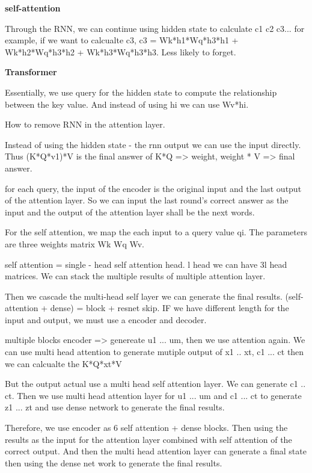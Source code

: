 \documentclass[8pt,UTF8]{article}
\begin{document}
            \textbf{self-attention}
            
            Through the RNN, we can continue using hidden state to calculate c1 c2 c3... for example, if we want to calcualte c3, c3 = Wk*h1*Wq*h3*h1 + Wk*h2*Wq*h3*h2 + Wk*h3*Wq*h3*h3. Less likely to forget.
            
            \textbf{Transformer}
            
            Essentially, we use query for the hidden state to compute the relationship between the key value. And instead of using hi we can use Wv*hi.
            
            How to remove RNN in the attention layer.
            
            Instead of using the hidden state - the rnn output we can use the input directly. Thus (K*Q*v1)*V is the final answer of K*Q => weight, weight * V => final answer.
            
            for each query, the input of the encoder is the original input and the last output of the attention layer.  So we can input the last round's correct answer as the input and the output of the attention layer shall be the next words. 
            
            For the self attention, we map the each input to a query value qi.  The parameters are three weights matrix Wk Wq Wv.
            
            self attention = single - head self attention head.  l head we can have 3l head matrices. We can stack the multiple results of multiple attention layer. 
            
            Then we cascade the multi-head self layer we can generate the final results. (self-attention + dense) = block + resnet skip. IF we have different length for the input and output, we must use a encoder and decoder.
            
            multiple blocks encoder => genereate u1 ... um, then we use attention again. We can use multi head attention to generate mutiple output of x1 .. xt, c1 ... ct then we can calcualte the K*Q*xt*V
            
            But the output actual use a multi head self attention layer. We can generate c1 .. ct. Then we use multi head attention layer for u1 ... um and c1 ... ct to generate z1 ... zt and use dense network to generate the final results.
            
            Therefore, we use encoder as 6 self attention + dense blocks. Then using the results as the input for the attention layer combined with self attention of the correct output. And then the multi head attention layer can generate a final state then using the dense net work to generate the final results.
            
\end{document}
